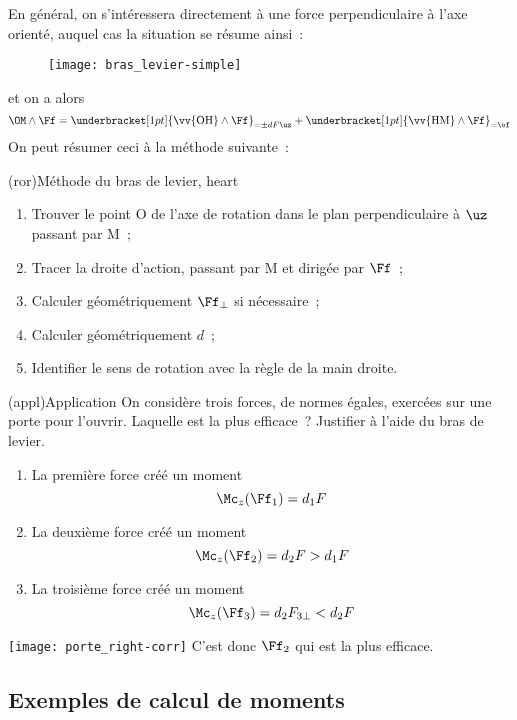 \documentclass[../../main/main.tex]{subfiles}
\begin{document}
En général, on s'intéressera directement à une force perpendiculaire à l'axe
orienté, auquel cas la situation se résume ainsi~:
\begin{figure}[H]
	\centering
	\texttt{[image: bras\_levier-simple]}
\end{figure}
et on a alors
\[
	\OM\wedge\Ff =
	\underbracket[1pt]{\vv{\rm OH}\wedge\Ff}_{=\pm dF\uz} +
	\underbracket[1pt]{\vv{\rm HM}\wedge\Ff}_{=\of}
\]
On peut résumer ceci à la méthode suivante~:

\begin{tcb*}(ror){Méthode du bras de levier, heart}
	\begin{enumerate}
		\item Trouver le point O de l'axe de rotation dans le plan
		      perpendiculaire à $\uz$ passant par M~;
		\item Tracer la droite d'action, passant par M et dirigée par $\Ff$~;
		\item Calculer géométriquement $\Ff_\perp$ si nécessaire~;
		\item Calculer géométriquement $d$~;
		\item Identifier le sens de rotation avec la règle de la main droite.
	\end{enumerate}
\end{tcb*}

\begin{tcb*}[sidebyside](appl){Application}
	On considère trois forces, de normes égales, exercées sur une porte pour
	l'ouvrir. Laquelle est la plus efficace~? Justifier à l'aide du bras de
	levier.
	\smallbreak
	\smallbreak
	\begin{enumerate}
		\item La première force créé un moment
		      \[\Mc_z(\Ff_1) = d_1F\]
		\item La deuxième force créé un moment
		      \[\Mc_z(\Ff_2) = d_2F > d_1F\]
		\item La troisième force créé un moment
		      \[\Mc_z(\Ff_3) = d_2F_{3\perp} < d_2F\]
	\end{enumerate}
	\tcblower
	\begin{center}
		\texttt{[image: porte\_right-corr]}
		C'est donc $\Ff_2$ qui est la plus efficace.
	\end{center}
\end{tcb*}

\subsection{Exemples de calcul de moments}
\end{document}

